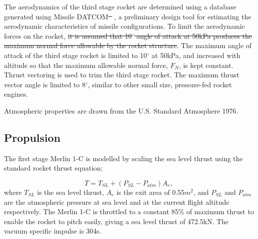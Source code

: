 \documentclass[journal]{new-aiaa}
\providecommand{\DIFadd}[1]{{\protect\color{blue}\uwave{#1}}} %
\providecommand{\DIFdel}[1]{{\protect\color{red}\sout{#1}}}                      %
\providecommand{\DIFaddbegin}{} %
\providecommand{\DIFaddend}{} %
\providecommand{\DIFdelbegin}{} %
\providecommand{\DIFdelend}{} %
\newcommand{\DIFscaledelfig}{0.5}
\newlength{\DIFdelgraphicswidth} %
\newlength{\DIFdelgraphicsheight} %
\newcommand{\DIFaddincludegraphics}[2][]{{\color{blue}\fbox{\DIFOincludegraphics[#1]{#2}}}} %
\newcommand{\DIFdelincludegraphics}[2][]{%
\sbox{\DIFdelgraphicsbox}{\DIFOincludegraphics[#1]{#2}}%
\settoboxwidth{\DIFdelgraphicswidth}{\DIFdelgraphicsbox} %
\settoboxtotalheight{\DIFdelgraphicsheight}{\DIFdelgraphicsbox} %
\scalebox{\DIFscaledelfig}{%
\parbox[b]{\DIFdelgraphicswidth}{\usebox{\DIFdelgraphicsbox}\\[-\baselineskip] \rule{\DIFdelgraphicswidth}{0em}}\llap{\resizebox{\DIFdelgraphicswidth}{\DIFdelgraphicsheight}{%
\setlength{\unitlength}{\DIFdelgraphicswidth}%
\begin{picture}(1,1)%
\thicklines\linethickness{2pt} %
{\color[rgb]{1,0,0}\put(0,0){\framebox(1,1){}}}%
{\color[rgb]{1,0,0}\put(0,0){\line( 1,1){1}}}%
{\color[rgb]{1,0,0}\put(0,1){\line(1,-1){1}}}%
\end{picture}%
}\hspace*{3pt}}} %
} %
\DeclareRobustCommand{\DIFaddbegin}{\DIFOaddbegin \let\includegraphics\DIFaddincludegraphics} %
\DeclareRobustCommand{\DIFaddend}{\DIFOaddend \let\includegraphics\DIFOincludegraphics} %
\DeclareRobustCommand{\DIFdelbegin}{\DIFOdelbegin \let\includegraphics\DIFdelincludegraphics} %
\DeclareRobustCommand{\DIFdelend}{\DIFOaddend \let\includegraphics\DIFOincludegraphics} %
\begin{document}
The aerodynamics of the third stage rocket are determined using a database generated using Missile DATCOM\DIFdelbegin \DIFdel{\mbox{%
\cite{Blake1998}}%
}\DIFdelend \DIFaddbegin \DIFadd{\mbox{%
\cite{Rosema2011}}%
}\DIFaddend , a preliminary design tool for estimating the aerodynamic characteristics of missile configurations. 
To limit the aerodynamic forces on the rocket, \DIFdelbegin \DIFdel{it is assumed that 10$^\circ$ angle of attack at 50kPa produces the maximum normal force allowable by the rocket structure}\DIFdelend \DIFaddbegin \DIFadd{\textcolor{red}{the maximum normal force allowable by the rocket structure is set as the normal force produced by 10$^\circ$ angle of attack at 50kPa flight}}\DIFaddend . The maximum angle of attack of the third stage rocket is \DIFaddbegin \DIFadd{thus }\DIFaddend limited to 10$^\circ$ at 50kPa, and increased with altitude so that the maximum allowable normal force, $F_N$, is kept constant. Thrust vectoring is used to trim the third stage rocket. The maximum thrust vector angle is limited to 8$^\circ$, similar to other small size, pressure-fed rocket engines\cite{Zandbergen}. 

Atmospheric properties are drawn from the U.S. Standard Atmosphere 1976\cite{Administration1976}.  
\subsection{Propulsion}
The first stage Merlin 1-C is modelled by scaling the sea level thrust using the standard rocket thrust equation;

\begin{equation}
T = T_{SL} + (P_{SL}-P_{atm}) A_e,
\end{equation}
where $T_{SL}$ is the sea level thrust, $A_e$ is the exit area of 0.55$m^2$, and $P_{SL}$ and $P_{atm}$ are the atmospheric pressure at sea level and at the current flight altitude respectively. The Merlin 1-C is throttled to a constant 85\% of maximum thrust to enable the rocket to pitch easily, giving a sea level thrust of 472.5kN\cite{Vehicle2008}. The vacuum specific impulse is 304s\cite{Vehicle2008}.
\end{document}
